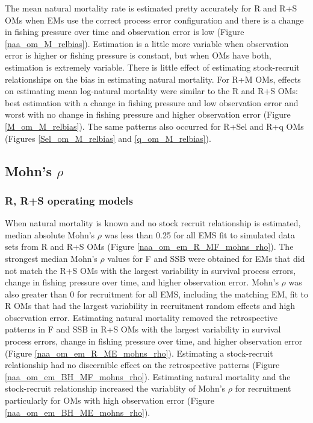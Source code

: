 \documentclass[
  12pt,
]{article}
\begin{document}
The mean natural mortality rate is estimated pretty accurately for R and
R+S OMs when EMs use the correct process error configuration and there
is a change in fishing pressure over time and observation error is low
(Figure \ref{naa_om_M_relbias}). Estimation is a little more variable
when observation error is higher or fishing pressure is constant, but
when OMs have both, estimation is extremely variable. There is little
effect of estimating stock-recruit relationships on the bias in
estimating natural mortality. For R+M OMs, effects on estimating mean
log-natural mortality were similar to the R and R+S OMs: best estimation
with a change in fishing pressure and low observation error and worst
with no change in fishing pressure and higher observation error (Figure
\ref{M_om_M_relbias}). The same patterns also occurred for R+Sel and R+q
OMs (Figures \ref{Sel_om_M_relbias} and \ref{q_om_M_relbias}).

\hypertarget{mohns-rho-1}{%
\subsection*{\texorpdfstring{Mohn's
\(\rho\)}{Mohn's \textbackslash rho}}\label{mohns-rho-1}}

\hypertarget{r-rs-operating-models-4}{%
\subsubsection*{R, R+S operating models}\label{r-rs-operating-models-4}}

When natural mortality is known and no stock recruit relationship is
estimated, median absolute Mohn's \(\rho\) was less than 0.25 for all
EMS fit to simulated data sets from R and R+S OMs (Figure
\ref{naa_om_em_R_MF_mohns_rho}). The strongest median Mohn's \(\rho\)
values for F and SSB were obtained for EMs that did not match the R+S
OMs with the largest variability in survival process errors, change in
fishing pressure over time, and higher observation error. Mohn's
\(\rho\) was also greater than 0 for recruitment for all EMS, including
the matching EM, fit to R OMs that had the largest variability in
recruitment random effects and high observation error. Estimating
natural mortality removed the retrospective patterns in F and SSB in R+S
OMs with the largest variability in survival process errors, change in
fishing pressure over time, and higher observation error (Figure
\ref{naa_om_em_R_ME_mohns_rho}). Estimating a stock-recruit relationship
had no discernible effect on the retrospective patterns (Figure
\ref{naa_om_em_BH_MF_mohns_rho}). Estimating natural mortality and the
stock-recruit relationship increased the variablity of Mohn's \(\rho\)
for recruitment particularly for OMs with high observation error (Figure
\ref{naa_om_em_BH_ME_mohns_rho}).
\end{document}
